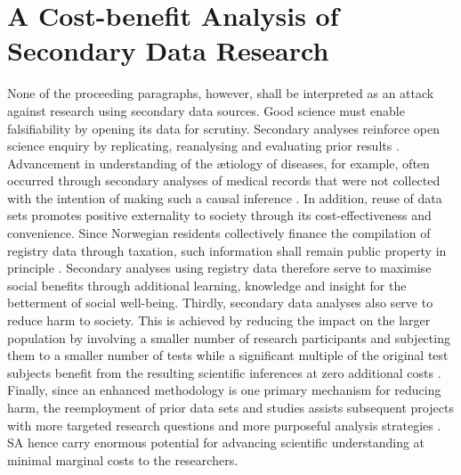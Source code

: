 \documentclass[
        a4paper, %
        12pt, %
        stu, %
        noextraspace, %
        floatsintext, %
        biblatex, %
        twoside, %
        colorlinks=true,        %
        linkcolor=red,          %
        anchorcolor=red,      %
        citecolor=blue,         %
        urlcolor=blue,          %
        bookmarks=true,         %
        bookmarksopen=false,    %
        bookmarksnumbered=true,  %
        dvipsnames
]{apa7}
\begin{document}
\section{A Cost-benefit Analysis of Secondary Data Research}

None of the proceeding paragraphs, however, shall be interpreted as an attack against research using secondary data sources. Good science must enable falsifiability by opening its data for scrutiny. Secondary analyses reinforce open science enquiry by replicating, reanalysing and evaluating prior results \parencite{hedrick:1985}. Advancement in understanding of the {\ae}tiology of diseases, for example, often occurred through secondary analyses of medical records that were not collected with the intention of making such a causal inference \parencite{dale:1988}. In addition, reuse of data sets promotes positive externality to society through its cost-effectiveness and convenience. Since Norwegian residents collectively finance the compilation of registry data through taxation, such information shall remain public property in principle \parencite{daveysmith:1994}. Secondary analyses using registry data therefore serve to maximise social benefits through additional learning, knowledge and insight for the betterment of social well-being. Thirdly, secondary data analyses also serve to reduce harm to society. This is achieved by reducing the impact on the larger population by involving a smaller number of research participants and subjecting them to a smaller number of tests while a significant multiple of the original test subjects benefit from the resulting scientific inferences at zero additional costs \parencite{law:2005}. Finally, since an enhanced methodology is one primary mechanism for reducing harm, the reemployment of prior data sets and studies assists subsequent projects with more targeted research questions and more purposeful analysis strategies \parencite{daveysmith:1994}. SA hence carry enormous potential for advancing scientific understanding at minimal marginal costs to the researchers.
\end{document}
